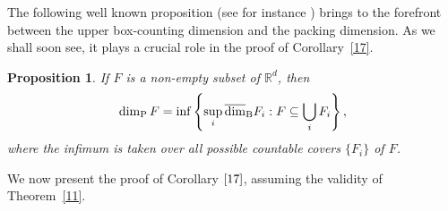 \documentclass[12pt]{article}
\newtheorem{proposition}{Proposition}[section]
\theoremstyle{definition}
\theoremstyle{remark}
\begin{document}
\noindent The following well known  proposition (see for instance  \cite[Proposition 3.8]{F2003}) brings to the forefront  between the upper box-counting dimension and the packing dimension.  As we shall soon see, it  plays a crucial role in the proof of Corollary~\ref{17}.
\begin{proposition}\label{23}
If $F$ is a non-empty subset of $\mathbb{R}^{d}$, then
$$\dim_{\rm P}F=\inf\left\{\sup_{i}\overline{\dim}_{\rm B}F_{i}:F\subseteq\bigcup_{i}F_{i}\right\},$$
where the  infimum   is taken over all possible countable covers $\{F_i\}$ of $F$.
\end{proposition}

\bigskip 

We now  present the proof of Corollary $\ref{17}$,  assuming the validity  of  Theorem~\ref{11}. 

\medskip 
\end{document}
